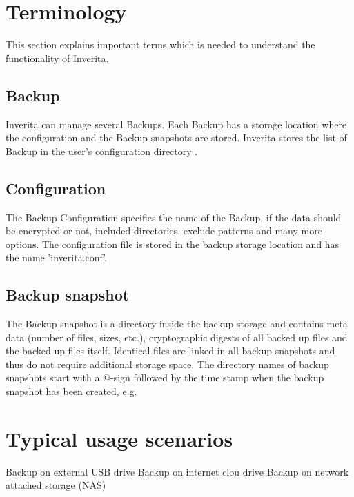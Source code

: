 \section{Terminology}

This section explains important terms which is needed to understand
the functionality of Inverita.

\subsection{Backup}
Inverita can manage several Backups. Each Backup has
a storage location where the configuration and the
Backup snapshots are stored.
Inverita stores the list of Backup in the user's
configuration directory .

\label{test1}

\subsection{Configuration}
The Backup Configuration specifies the name of the Backup,
if the data should be encrypted or not, included
directories, exclude patterns and many more options.
The configuration file is stored in the backup storage
location and has the name 'inverita.conf'.

\subsection{Backup snapshot}
The Backup snapshot is a directory inside the
backup storage and contains meta data (number of files, sizes, etc.),
cryptographic digests of all backed up files and the backed up files itself.
Identical files are linked in all backup snapshots and thus do not
require additional storage space.
The directory names of backup snapshots start with a @-sign followed by
the time stamp when the backup snapshot has been created, e.g. 

\section{Typical usage scenarios}
       Backup on external USB drive
       Backup on internet clou drive
       Backup on network attached storage (NAS)

